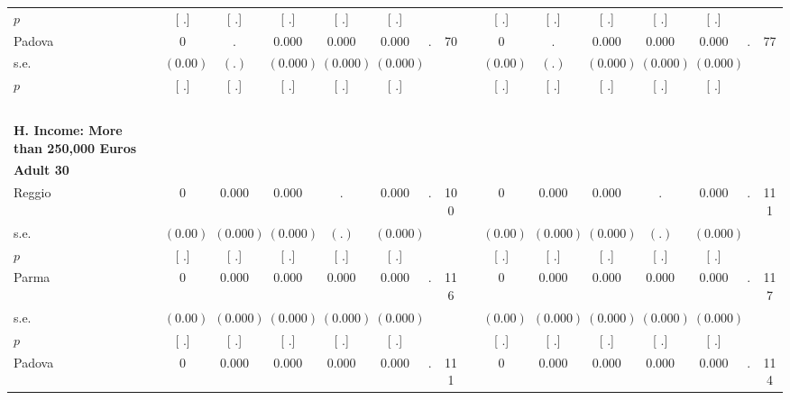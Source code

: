 \begin{longtable}{L{8em} c c c c c c c p{1em} c c c c c c c}
\quad \quad \quad \quad $ p$ & [        .] & [        .] & [        .] & [        .] & [        .] & & & & [        .] & [        .] & [        .] & [        .] & [        .] & &  \\[1em]
\quad \quad \quad Padova& 0 &         . &     0.000 &     0.000 &     0.000 &         . &        70 & & 0 &         . &     0.000 &     0.000 &     0.000 &         . &        77  \\*
\quad \quad \quad \quad s.e.& $ (     0.00)$ & $ (        .)$ & $ (    0.000)$ & $ (    0.000)$ & $ (    0.000)$ & & & & $ (     0.00)$ & $ (        .)$ & $ (    0.000)$ & $ (    0.000)$ & $ (    0.000)$ & &  \\*
\quad \quad \quad \quad $ p$ & [        .] & [        .] & [        .] & [        .] & [        .] & & & & [        .] & [        .] & [        .] & [        .] & [        .] & &  \\[1em]
~\\[1em]
\textbf{H. Income: More than 250,000 Euros} \\*
\quad \quad \textbf{Adult 30} & & & & & & & & & & & & & & & \\* 
\quad \quad \quad Reggio& 0 &     0.000 &     0.000 &         . &     0.000 &         . &       100 & & 0 &     0.000 &     0.000 &         . &     0.000 &         . &       111  \\*
\quad \quad \quad \quad s.e.& $ (     0.00)$ & $ (    0.000)$ & $ (    0.000)$ & $ (        .)$ & $ (    0.000)$ & & & & $ (     0.00)$ & $ (    0.000)$ & $ (    0.000)$ & $ (        .)$ & $ (    0.000)$ & &  \\*
\quad \quad \quad \quad $ p$ & [        .] & [        .] & [        .] & [        .] & [        .] & & & & [        .] & [        .] & [        .] & [        .] & [        .] & &  \\[1em]
\quad \quad \quad Parma& 0 &     0.000 &     0.000 &     0.000 &     0.000 &         . &       116 & & 0 &     0.000 &     0.000 &     0.000 &     0.000 &         . &       117  \\*
\quad \quad \quad \quad s.e.& $ (     0.00)$ & $ (    0.000)$ & $ (    0.000)$ & $ (    0.000)$ & $ (    0.000)$ & & & & $ (     0.00)$ & $ (    0.000)$ & $ (    0.000)$ & $ (    0.000)$ & $ (    0.000)$ & &  \\*
\quad \quad \quad \quad $ p$ & [        .] & [        .] & [        .] & [        .] & [        .] & & & & [        .] & [        .] & [        .] & [        .] & [        .] & &  \\[1em]
\quad \quad \quad Padova& 0 &     0.000 &     0.000 &     0.000 &     0.000 &         . &       111 & & 0 &     0.000 &     0.000 &     0.000 &     0.000 &         . &       114  \\*

\end{longtable}
